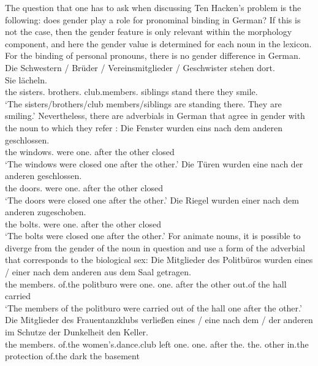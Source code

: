 The question that one has to ask when discussing Ten Hacken's problem is the following: does gender play a role for pronominal binding
in German? If this is not the case, then the gender feature is only relevant within the morphology
component, and here the gender value is determined for each noun in the lexicon. For the binding of personal pronouns, there is no gender difference in German. 
\ea
\gll Die Schwestern / Brüder / Vereinsmitglieder / Geschwister stehen dort.~~~~~~ Sie lächeln.\\
     the sisters.\fem{} {} brothers.\mas{} {} club.members.\neu{} {} siblings stand there they smile.\\
\glt `The sisters/brothers/club members/siblings are standing there. They are smiling.'
\z
Nevertheless, there are adverbials in German that agree in gender with the noun to which they refer \citep[Chapter~6]{Hoehle83a}:
\eal
\label{Beispiel-einer-nach-dem-anderen}
\ex
\gll Die Fenster wurden eins nach dem anderen geschlossen.\\
	 the windows.\neu{} were one.\neu{} after the other closed\\
\glt `The windows were closed one after the other.'
\ex 
\gll Die Türen wurden eine nach der anderen geschlossen.\\
	the doors.\fem{} were one.\fem{} after the other closed\\
\glt `The doors were closed one after the other.'
\ex 
\gll Die Riegel wurden einer nach dem anderen zugeschoben.\\
	 the bolts.\mas{} were one.\mas{} after the other closed\\
	 \glt `The bolts were closed one after the other.'
\zl
For animate nouns, it is possible to diverge from the gender of the noun in question and use a form of
the adverbial that corresponds to the biological sex:
\eal
\ex 
\gll Die Mitglieder des Politbüros wurden eines / einer nach dem anderen aus dem Saal getragen.\\
	 the members.\neu{} of.the politburo were one.\neu{} {} one.\mas{} after the other out.of the hall carried\\
\glt `The members of the politburo were carried out of the hall one after the other.'
\ex 
\gll Die Mitglieder des Frauentanzklubs verließen eines / eine nach dem / der anderen im Schutze der Dunkelheit den
Keller.\\
the members.\neu{} of.the women's.dance.club left one.\neu{} {} one.\fem{} after the.\neu{} {} the.\fem{} other in.the protection of.the dark the
basement\\
